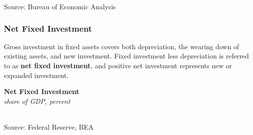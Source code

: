 \documentclass{report}
\makeatletter
\newcommand{\tbllink}[1]{\href{https://raw.githubusercontent.com/bdecon/US-chartbook/master/chartbook/data/#1}{\faTable}}
\newcommand*\short[1]{\expandafter\@gobbletwo\number\numexpr#1\relax}
\newcommand{\absnode}[3]{\node[below right, align=left] at (axis cs: #1,#2) {#3};}
\newcommand{\shdateaxisticks}{
		date coordinates in=x, axis line style={draw=none},
		xmax={2022-10-31},
		max space between ticks=40,	    
		xtick={{1990-01-01}, {1995-01-01}, {2000-01-01}, 
			{2005-01-01}, {2010-01-01}, {2015-01-01}, {2020-01-01}},
		minor xtick={},
		enlarge y limits={0.06}, enlarge x limits={0.01},
		}
\newcommand{\bbar}[2]{extra #1 ticks = {{#2}}, extra #1 tick labels = ,
		extra #1 tick style = {grid=major, grid style={thick, black!25}},}
\newcommand{\stdline}[4]{\addplot[very thick, no markers, color=#1] 
		table [x=#2, y=#3, col sep=comma] {#4};	}
\newcommand{\rbars}{
		\fill[color=black!10] (axis cs:{1990-07-01},\pgfkeysvalueof{/pgfplots/ymin}) rectangle 
			(axis cs:{1991-03-01}, \pgfkeysvalueof{/pgfplots/ymax});
		\fill[color=black!10] (axis cs:{2007-12-01},\pgfkeysvalueof{/pgfplots/ymin}) rectangle 
			(axis cs:{2009-07-01}, \pgfkeysvalueof{/pgfplots/ymax});
		\fill[color=black!10] (axis cs:{2001-03-01},\pgfkeysvalueof{/pgfplots/ymin}) rectangle 
			(axis cs:{2001-11-01}, \pgfkeysvalueof{/pgfplots/ymax});
		\fill[color=black!10] (axis cs:{2020-02-01},\pgfkeysvalueof{/pgfplots/ymin}) rectangle 
			(axis cs:{2020-05-01}, \pgfkeysvalueof{/pgfplots/ymax});}
\makeatother
\begin{document}
{\begin{minipage}{0.76\textwidth}
\footnotesize{Source: Bureau of Economic Analysis} \hfill \tbllink{inv.csv} 
\end{minipage}
\newpage
\begin{minipage}{0.76\textwidth}
\subsubsection*{Net Fixed Investment}
\vspace{-1.5mm}
\small Gross investment in fixed assets covers both depreciation, the wearing down of existing assets, and new investment. Fixed investment less depreciation is referred to as \textbf{net fixed investment}, and positive net investment represents new or expanded investment. 

\begin{minipage}{0.445\textwidth}
\small 
\end{minipage} \hfill
\begin{minipage}{0.49\textwidth}
\normalsize \textbf{Net Fixed Investment}\\
\footnotesize{\textit{share of GDP, percent}}\\
\hspace*{-2mm} \\
\footnotesize{Source: Federal Reserve, BEA} \hfill \tbllink{z1_nfi.csv}
\end{minipage}

\small 
\vspace{0.5mm}


\end{minipage}}
\end{document}

